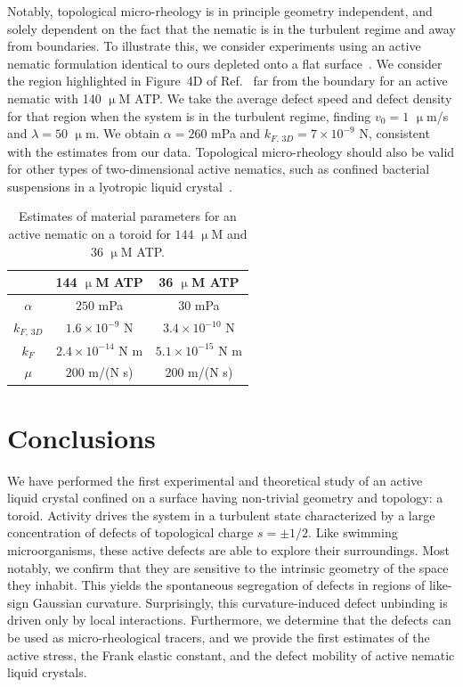 Notably, topological micro-rheology is in principle geometry independent, and solely dependent on the fact that the nematic is in the turbulent regime and away from boundaries.
To illustrate this, we consider experiments using an active nematic formulation identical to ours depleted onto a flat surface~\cite{RN134}. We consider the region highlighted in Figure~4D of Ref.~\cite{RN134} far from the boundary for an active nematic with 140 $\upmu$M ATP.
We take the average defect speed and defect density for that region when the system is in the turbulent regime, finding $v_0 = 1$ $\upmu$m/s and $\lambda = 50$ $\upmu$m.
We obtain $\alpha = 260$ mPa and $k_{F,\, 3D} = 7 \times 10^{-9}$ N, consistent with the estimates from our data.
Topological micro-rheology should also be valid for other types of two-dimensional active nematics, such as confined bacterial suspensions in a lyotropic liquid crystal~\cite{RN86}.
\begin{table}
  \centering
  \caption{Estimates of material parameters for an active nematic on a toroid for $144$ $\upmu$M and 36 $\upmu$M ATP.}
  \begin{tabular}{|c|c c|}
    \hline
     & 144 $\upmu$M ATP & 36 $\upmu$M ATP \\
     \hline
     $\alpha$ &  $250$ mPa & $30$ mPa \\
     $k_{F,\, 3D}$ & $1.6 \times 10^{-9}$ N & $3.4 \times 10^{-10}$ N \\
     $k_F$ & $2.4 \times 10^{-14}$ N m & $5.1 \times 10^{-15}$ N m \\
     $\mu$ & 200 m/(N s) & 200 m/(N s) \\
     \hline
  \end{tabular}\label{t:3-MaterialParams}
\end{table}



\section{Conclusions}
We have performed the first experimental and theoretical study of an active liquid crystal confined on a surface having non-trivial geometry and topology: a toroid.
Activity drives the system in a turbulent state characterized by a large concentration of defects of topological charge $s = \pm 1/2$.
Like swimming microorganisms, these active defects are able to explore their surroundings.
Most notably, we confirm that they are sensitive to the intrinsic geometry of the space they inhabit.
This yields the spontaneous segregation of defects in regions of like-sign Gaussian curvature.
Surprisingly, this curvature-induced defect unbinding is driven only by local interactions.
Furthermore, we determine that the defects can be used as micro-rheological tracers, and we provide the first estimates of the active stress, the Frank elastic constant, and the defect mobility of active nematic liquid crystals.

